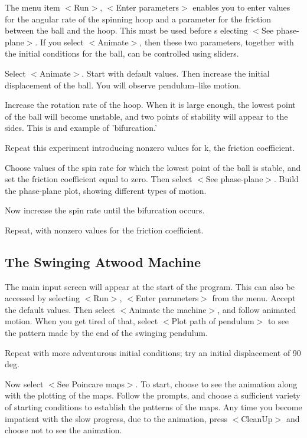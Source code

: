    The menu item $<$Run$>$, $<$Enter parameters$>$ enables you to enter
values for the angular rate of the spinning hoop and a parameter for
the friction between the ball and the hoop. This must be used before s
electing $<$See phase-plane$>$. If you select $<$Animate$>$, then these
two parameters, together with the initial conditions for the ball,
can be controlled using sliders.

Select $<$Animate$>$. Start with default values. Then increase the initial
displacement of the ball. You will observe pendulum--like motion.

   Increase the rotation rate of the hoop. When it is large enough,
the lowest point of the ball will become unstable, and two points
of stability will appear to the sides. This is and example of 'bifurcation.'

   Repeat this experiment introducing nonzero values for k, the
friction coefficient.

   Choose values of the spin rate for which the lowest point of the ball
is stable, and set the friction coefficient equal to zero. Then select
$<$See phase-plane$>$. Build the phase-plane plot, showing different types of
motion.

   Now increase the spin rate until the  bifurcation occurs.

   Repeat, with nonzero values for the friction coefficient.



\subsection{The Swinging Atwood Machine}

   The main input screen will appear at the start of the program.
This can also be accessed by selecting $<$Run$>$, $<$Enter parameters$>$
from the menu. Accept the default values. Then select $<$Animate the
machine$>$, and follow animated motion. When you get tired of that,
select $<$Plot path of pendulum$>$ to see the pattern made by the end
of the swinging pendulum.

   Repeat with more adventurous initial conditions; try an initial
displacement of 90 deg.

   Now select $<$See Poincare maps$>$. To start, choose to see the animation
along with the plotting of the maps. Follow the prompts, and choose a
sufficient variety of starting conditions to establish the patterns of
the maps. Any time you become impatient with the slow progress, due to
the animation, press $<$CleanUp$>$ and choose not to see the animation.
                                                                                                   

